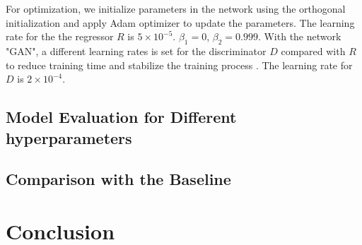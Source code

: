 \documentclass[journal]{vgtc}                %
\begin{document}
For optimization, we initialize parameters in the network using the orthogonal
initialization \cite{saxe2013exact} and apply Adam optimizer \cite{kingma2014adam} to update the parameters. The learning rate for the the regressor $R$ is $5 \times 10^{-5}$. $\beta_1 = 0$, $\beta_2 = 0.999$. With the network "GAN", a different learning rates is set for the discriminator $D$ compared with $R$ to reduce training time and stabilize the training process \cite{roth2017stabilizing}. The learning rate for $D$ is $2 \times 10^{-4}$. 

\subsection{Model Evaluation for Different hyperparameters }

\subsection{Comparison with the Baseline}




\section{Conclusion}


%

%
%
%


\end{document}
